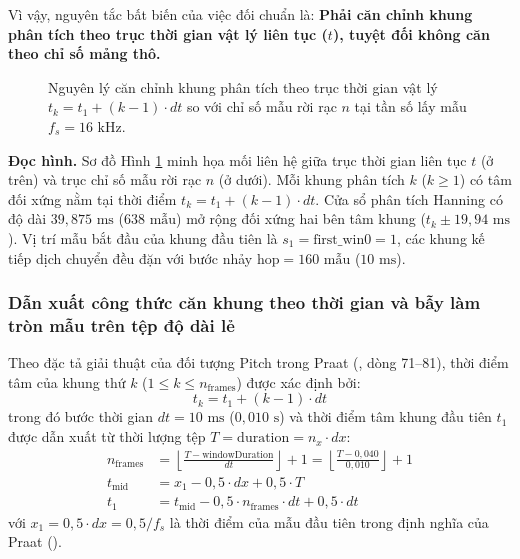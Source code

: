Vì vậy, nguyên tắc bất biến của việc đối chuẩn là: \textbf{Phải căn chỉnh khung phân tích theo trục thời gian vật lý liên tục ($t$), tuyệt đối không căn theo chỉ số mảng thô.}

\begin{figure}[htbp]
\centering

\caption{Nguyên lý căn chỉnh khung phân tích theo trục thời gian vật lý $t_k = t_1 + (k - 1) \cdot dt$ so với chỉ số mẫu rời rạc $n$ tại tần số lấy mẫu $f_s = 16\text{ kHz}$.}
\label{fig:ch13_frame_align}
\end{figure}

\textbf{Đọc hình.} Sơ đồ Hình \ref{fig:ch13_frame_align} minh họa mối liên hệ giữa trục thời gian liên tục $t$ (ở trên) và trục chỉ số mẫu rời rạc $n$ (ở dưới). Mỗi khung phân tích $k$ ($k \ge 1$) có tâm đối xứng nằm tại thời điểm $t_k = t_1 + (k - 1) \cdot dt$. Cửa sổ phân tích Hanning có độ dài $39{,}875\text{ ms}$ ($638\text{ mẫu}$) mở rộng đối xứng hai bên tâm khung ($t_k \pm 19{,}94\text{ ms}$). Vị trí mẫu bắt đầu của khung đầu tiên là $s_1 = \text{first\_win0} = 1$, các khung kế tiếp dịch chuyển đều đặn với bước nhảy $\text{hop} = 160\text{ mẫu}$ ($10\text{ ms}$).

\subsubsection*{Dẫn xuất công thức căn khung theo thời gian và bẫy làm tròn mẫu trên tệp độ dài lẻ}
Theo đặc tả giải thuật của đối tượng Pitch trong Praat (, dòng 71--81), thời điểm tâm của khung thứ $k$ ($1 \le k \le n_{\text{frames}}$) được xác định bởi:
\begin{equation}
    t_k = t_1 + (k - 1) \cdot dt
\end{equation}
trong đó bước thời gian $dt = 10\text{ ms}$ ($0{,}010\text{ s}$) và thời điểm tâm khung đầu tiên $t_1$ được dẫn xuất từ thời lượng tệp $T = \text{duration} = n_x \cdot dx$:
\begin{align}
    n_{\text{frames}} &= \left\lfloor \frac{T - \text{windowDuration}}{dt} \right\rfloor + 1 = \left\lfloor \frac{T - 0{,}040}{0{,}010} \right\rfloor + 1 \\
    t_{\text{mid}} &= x_1 - 0{,}5 \cdot dx + 0{,}5 \cdot T \\
    t_1 &= t_{\text{mid}} - 0{,}5 \cdot n_{\text{frames}} \cdot dt + 0{,}5 \cdot dt
\end{align}
với $x_1 = 0{,}5 \cdot dx = 0{,}5 / f_s$ là thời điểm của mẫu đầu tiên trong định nghĩa của Praat ().

